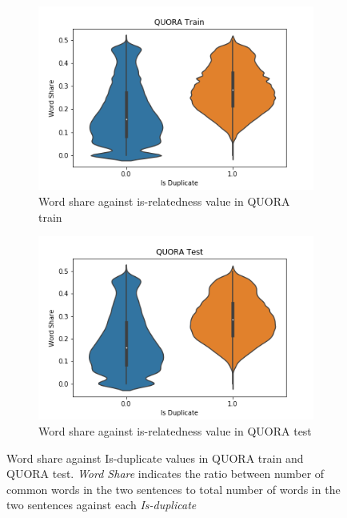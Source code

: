 \begin{enumerate}
\begin{figure}
	\captionsetup[subfigure]{justification=centering}
	\centering
	\begin{subfigure}[b]{.5\textwidth}
		\centering
		\includegraphics[width=\textwidth]{figures/semantic_textual_similarity/introduction/quora_train_word_share.png}
		\caption{Word share against is-relatedness value in QUORA train}
		\label{fig:quora_train_word_share}
	\end{subfigure}%
	\begin{subfigure}[b]{.5\textwidth}
		\centering
		\includegraphics[width=\textwidth]{figures/semantic_textual_similarity/introduction/quora_test_word_share.png}
		\caption{Word share against is-relatedness value in QUORA test}
		\label{fig:quora_test_word_share}
	\end{subfigure}
	\caption[Word share against Is-duplicate values in QUORA train and QUORA test.]{Word share against Is-duplicate values in QUORA train and QUORA test. \textit{Word Share} indicates the ratio between number of common words in the two sentences to total number of words in the two sentences against each \textit{Is-duplicate}}
	\label{fig:quora_word_share}
\end{figure}


\end{enumerate}
